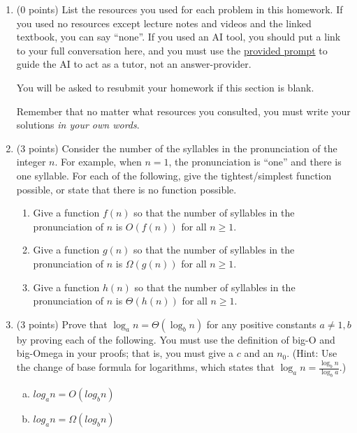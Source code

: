 \documentclass[11pt]{article}
\begin{document}


\begin{enumerate}


\item (0 points) List the resources you used for each problem in this homework. If you used no resources except
lecture notes and videos and the linked textbook, you can say ``none''. If you used
an AI tool, you should put a link to your full conversation here, and you must
use the
\href{https://umaal.org/files/teaching/csci332_fall2026/agents.md}{provided
prompt}
 to guide the AI to act
as a tutor, not an answer-provider.

You will be asked to resubmit your homework if this section is blank.

Remember that no matter what resources you consulted, you must write your solutions
\emph{in your own words}.

\item (3 points) Consider the number of the syllables in the pronunciation of the integer $n$.
For example, when $n=1$, the pronunciation is ``one'' and there is one syllable.
For each of the following, give the tightest/simplest function possible, or state that
there is no function possible.
\begin{enumerate}
    \item Give a function $f(n)$ so that the number of syllables in the pronunciation of $n$ is $O(f(n))$ for all $n \geq 1$.
    \item Give a function $g(n)$ so that the number of syllables in the pronunciation of $n$ is $\Omega(g(n))$ for all $n \geq 1$.
    \item Give a function $h(n)$ so that the number of syllables in the pronunciation of $n$ is $\Theta(h(n))$ for all $n \geq 1$.
\end{enumerate}

\item (3 points) Prove that $\log_a n = \Theta(\log_b n)$ for any positive
constants $a \neq 1, b$ by proving each of the following. You must use the
definition of big-O and big-Omega in your proofs; that is, you must give a $c$
and an $n_0$. (Hint: Use the change of base formula for logarithms, which states
that $\log_a n = \frac{\log_b n}{\log_b a}$.)

    \begin{enumerate}[(a)]
        \item $log_a n = O(log_b n)$
        \item $log_a n = \Omega(log_b n)$
    \end{enumerate} 


\end{enumerate}
\end{document}
